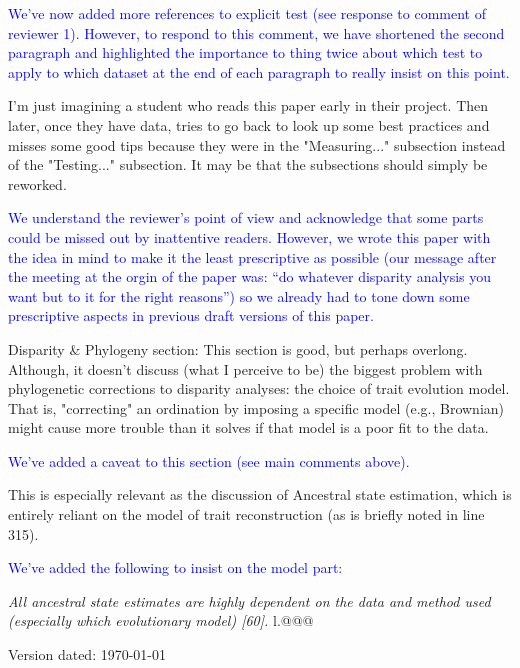 \documentclass[12pt,letterpaper]{article}
\begin{document}

\textcolor{blue}{We've now added more references to explicit test (see response to comment of reviewer 1). However, to respond to this comment, we have shortened the second paragraph and highlighted the importance to thing twice about which test to apply to which dataset at the end of each paragraph to really insist on this point.}

\noindent I'm just imagining a student who reads this paper early in their project. Then later, once they have data, tries to go back to look up some best practices and misses some good tips because they were in the "Measuring..." subsection instead of the "Testing..." subsection. It may be that the subsections should simply be reworked.

\textcolor{blue}{We understand the reviewer's point of view and acknowledge that some parts could be missed out by inattentive readers. However, we wrote this paper with the idea in mind to make it the least prescriptive as possible (our message after the meeting at the orgin of the paper was: ``do whatever disparity analysis you want but to it for the right reasons'') so we already had to tone down some prescriptive aspects in previous draft versions of this paper.}

\noindent Disparity \& Phylogeny section: This section is good, but perhaps overlong. Although, it doesn't discuss (what I perceive to be) the biggest problem with phylogenetic corrections to disparity analyses: the choice of trait evolution model.
That is, "correcting" an ordination by imposing a specific model (e.g., Brownian) might cause more trouble than it solves if that model is a poor fit to the data.

\textcolor{blue}{We've added a caveat to this section (see main comments above).}

\noindent This is especially relevant as the discussion of Ancestral state estimation, which is entirely reliant on the model of trait reconstruction (as is briefly noted in line 315).

\textcolor{blue}{We've added the following to insist on the model part:}

\textit{All ancestral state estimates are highly dependent on the data and method used (especially which evolutionary model) [60].} l.@@@


\begin{flushright}
Version dated: \today
\end{flushright}
\end{document}
